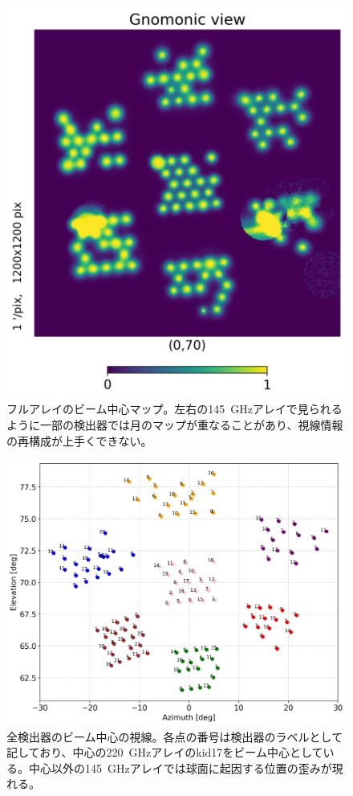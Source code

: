 \begin{figure}[htbp]
  \centering
  \includegraphics[width=0.7\columnwidth]{5_alignment/figs/before_full_gnomonic_70.png}
  \caption{フルアレイのビーム中心マップ。左右の\SI{145}{GHz}アレイで見られるように一部の検出器では月のマップが重なることがあり、視線情報の再構成が上手くできない。}
  \label{before_full_beam_map}
\end{figure}
\begin{figure}[htbp]
  \centering
  \includegraphics[width=1.0\columnwidth]{5_alignment/figs/before_full_pos_70.png}
  \caption{全検出器のビーム中心の視線。各点の番号は検出器のラベルとして記しており、中心の\SI{220}{GHz}アレイのkid17をビーム中心としている。中心以外の\SI{145}{GHz}アレイでは球面に起因する位置の歪みが現れる。}
  \label{before_full_beam_pos}
\end{figure}
